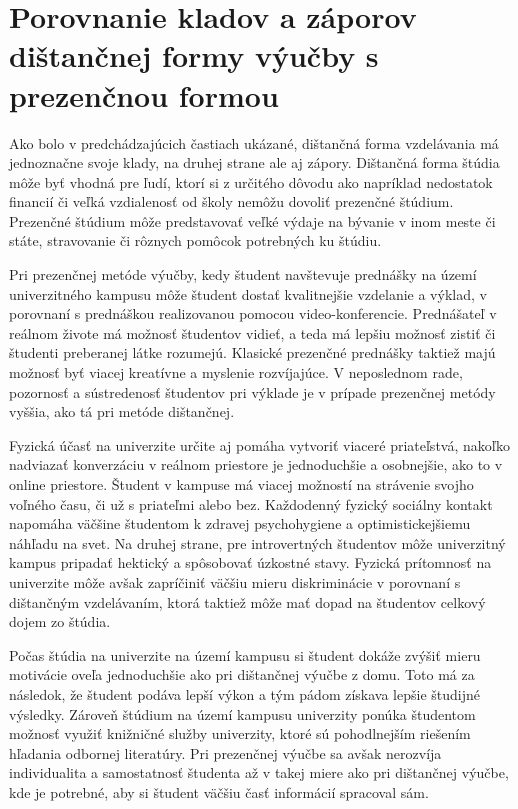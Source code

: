\documentclass[10pt,twoside,slovak,a4paper]{article}
\begin{document}
\section{Porovnanie kladov a záporov dištančnej formy výučby s prezenčnou formou}
	Ako bolo v predchádzajúcich častiach ukázané, dištančná forma vzdelávania má jednoznačne svoje klady, na druhej strane ale aj zápory. Dištančná forma štúdia môže byť vhodná pre ľudí, ktorí si z určitého dôvodu ako napríklad nedostatok financií či veľká vzdialenosť od školy nemôžu dovoliť prezenčné štúdium. Prezenčné štúdium môže predstavovať veľké výdaje na bývanie v inom meste či státe, stravovanie či rôznych pomôcok potrebných ku štúdiu.

	Pri prezenčnej metóde výučby, kedy študent navštevuje prednášky na území univerzitného kampusu môže študent dostať kvalitnejšie vzdelanie a výklad, v porovnaní s prednáškou realizovanou pomocou video-konferencie. Prednášateľ v reálnom živote má možnosť študentov vidieť, a teda má lepšiu možnosť zistiť či študenti preberanej látke rozumejú. Klasické prezenčné prednášky taktiež majú možnosť byť viacej kreatívne a myslenie rozvíjajúce. V neposlednom rade, pozornosť a sústredenosť študentov pri výklade je v prípade prezenčnej metódy vyššia, ako tá pri metóde dištančnej. 

	Fyzická účasť na univerzite určite aj pomáha vytvoriť viaceré priateľstvá, nakoľko nadviazať konverzáciu v reálnom priestore je jednoduchšie a osobnejšie, ako to v online priestore. Študent v kampuse má viacej možností na strávenie svojho voľného času, či už s priateľmi alebo bez. Každodenný fyzický sociálny kontakt napomáha väčšine študentom k zdravej psychohygiene a optimistickejšiemu náhľadu na svet. Na druhej strane, pre introvertných študentov môže univerzitný kampus pripadať hektický a spôsobovať úzkostné stavy. Fyzická prítomnosť na univerzite môže avšak zapríčiniť väčšiu mieru diskriminácie v porovnaní s dištančným vzdelávaním, ktorá taktiež môže mať dopad na študentov celkový dojem zo štúdia. 

	Počas štúdia na univerzite na území kampusu si študent dokáže zvýšiť mieru motivácie oveľa jednoduchšie ako pri dištančnej výučbe z domu. Toto má za následok, že študent podáva lepší výkon a tým pádom získava lepšie študijné výsledky. Zároveň štúdium na území kampusu univerzity ponúka študentom možnosť využiť knižničné služby univerzity, ktoré sú pohodlnejším riešením hľadania odbornej literatúry. Pri prezenčnej výučbe sa avšak nerozvíja individualita a samostatnosť študenta až v takej miere ako pri dištančnej výučbe, kde je potrebné, aby si študent väčšiu časť informácií spracoval sám.
\end{document}
